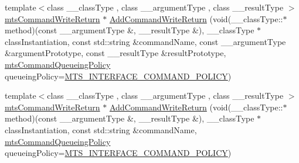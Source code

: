 {\bf }\par
\begin{DoxyCompactItemize}
\item 
{\footnotesize template$<$class \-\_\-\-\_\-class\-Type , class \-\_\-\-\_\-argument\-Type , class \-\_\-\-\_\-result\-Type $>$ }\\\hyperlink{classmts_command_write_return}{mts\-Command\-Write\-Return} $\ast$ \hyperlink{classmts_interface_provided_aedfb9472863d9ae3b563adb964f2268b}{Add\-Command\-Write\-Return} (void(\-\_\-\-\_\-class\-Type\-::$\ast$method)(const \-\_\-\-\_\-argument\-Type \&, \-\_\-\-\_\-result\-Type \&), \-\_\-\-\_\-class\-Type $\ast$class\-Instantiation, const std\-::string \&command\-Name, const \-\_\-\-\_\-argument\-Type \&argument\-Prototype, const \-\_\-\-\_\-result\-Type \&result\-Prototype, \hyperlink{mts_forward_declarations_8h_aa2ac24035e136fa1689dcc2854c63fc7}{mts\-Command\-Queueing\-Policy} queueing\-Policy=\hyperlink{mts_forward_declarations_8h_aa2ac24035e136fa1689dcc2854c63fc7a4f444b4120a5e2efd084e2e5a214f5c8}{M\-T\-S\-\_\-\-I\-N\-T\-E\-R\-F\-A\-C\-E\-\_\-\-C\-O\-M\-M\-A\-N\-D\-\_\-\-P\-O\-L\-I\-C\-Y})
\item 
{\footnotesize template$<$class \-\_\-\-\_\-class\-Type , class \-\_\-\-\_\-argument\-Type , class \-\_\-\-\_\-result\-Type $>$ }\\\hyperlink{classmts_command_write_return}{mts\-Command\-Write\-Return} $\ast$ \hyperlink{classmts_interface_provided_aaedd4c0ebff3c980bddc2ceb1202caff}{Add\-Command\-Write\-Return} (void(\-\_\-\-\_\-class\-Type\-::$\ast$method)(const \-\_\-\-\_\-argument\-Type \&, \-\_\-\-\_\-result\-Type \&), \-\_\-\-\_\-class\-Type $\ast$class\-Instantiation, const std\-::string \&command\-Name, \hyperlink{mts_forward_declarations_8h_aa2ac24035e136fa1689dcc2854c63fc7}{mts\-Command\-Queueing\-Policy} queueing\-Policy=\hyperlink{mts_forward_declarations_8h_aa2ac24035e136fa1689dcc2854c63fc7a4f444b4120a5e2efd084e2e5a214f5c8}{M\-T\-S\-\_\-\-I\-N\-T\-E\-R\-F\-A\-C\-E\-\_\-\-C\-O\-M\-M\-A\-N\-D\-\_\-\-P\-O\-L\-I\-C\-Y})
\end{DoxyCompactItemize}


